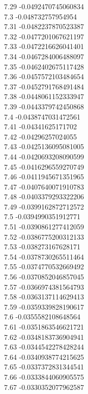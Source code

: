 {7.29	-0.0492470745060834\\
7.3	-0.048732757954954\\
7.31	-0.0482237870523387\\
7.32	-0.0477201067621197\\
7.33	-0.0472216626041401\\
7.34	-0.0467284006488097\\
7.35	-0.0462402675117428\\
7.36	-0.0457572103484654\\
7.37	-0.0452791768491484\\
7.38	-0.0448061152333947\\
7.39	-0.0443379742450868\\
7.4	-0.0438747031472561\\
7.41	-0.04341625171702\\
7.42	-0.04296257024055\\
7.43	-0.0425136095081005\\
7.44	-0.0420693208090599\\
7.45	-0.0416296559270749\\
7.46	-0.0411945671351965\\
7.47	-0.0407640071910783\\
7.48	-0.0403379293322206\\
7.49	-0.0399162872712572\\
7.5	-0.0394990351912771\\
7.51	-0.0390861277412059\\
7.52	-0.0386775200312133\\
7.53	-0.038273167628171\\
7.54	-0.0378730265511464\\
7.55	-0.0374770532669492\\
7.56	-0.0370852046857045\\
7.57	-0.0366974381564793\\
7.58	-0.0363137114629413\\
7.59	-0.0359339828190617\\
7.6	-0.0355582108648564\\
7.61	-0.0351863546621721\\
7.62	-0.0348183736904941\\
7.63	-0.0344542278428244\\
7.64	-0.0340938774215625\\
7.65	-0.0337372831344541\\
7.66	-0.0333844060905575\\
7.67	-0.0330352077962587\\
}
